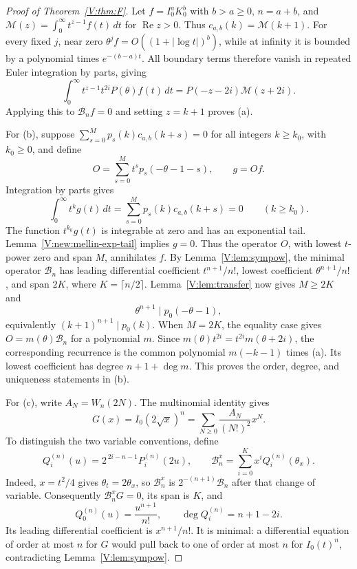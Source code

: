 \documentclass[11pt,a4paper]{article}
\theoremstyle{definition}
\theoremstyle{remark}
\numberwithin{equation}{section}
\begin{document}
\begin{proof}[Proof of Theorem~\ref{V:thm:F}]
Let $f=I_0^aK_0^b$ with $b>a\ge0$, $n=a+b$, and
$\mathcal M(z)=\int_0^\infty t^{z-1}f(t)\,dt$ for
$\operatorname{Re}z>0$. Thus $c_{a,b}(k)=\mathcal M(k+1)$.
For every fixed $j$, near zero
$\theta^jf=O((1+|\log t|)^b)$, while at infinity it is bounded by
a polynomial times $e^{-(b-a)t}$. All boundary terms therefore vanish
in repeated Euler integration by parts, giving
\[
 \int_0^\infty t^{z-1}t^{2i}P(\theta)f(t)\,dt
 =P(-z-2i)\mathcal M(z+2i).
\]
Applying this to $\mathcal B_nf=0$ and setting $z=k+1$ proves (a).

For (b), suppose
$\sum_{s=0}^{M}p_s(k)c_{a,b}(k+s)=0$ for all integers $k\ge k_0$,
with $k_0\ge0$, and define
\[
 O=\sum_{s=0}^{M}t^s p_s(-\theta-1-s),\qquad g=Of.
\]
Integration by parts gives
\[
 \int_0^\infty t^kg(t)\,dt
 =\sum_{s=0}^{M}p_s(k)c_{a,b}(k+s)=0\qquad(k\ge k_0).
\]
The function $t^{k_0}g(t)$ is integrable at zero and has an
exponential tail. Lemma~\ref{V:new:mellin-exp-tail} implies $g=0$.
Thus the operator $O$, with lowest $t$-power zero and span $M$,
annihilates $f$.
By Lemma~\ref{V:lem:sympow}, the minimal operator $\mathcal B_n$
has leading differential coefficient $t^{n+1}/n!$, lowest coefficient
$\theta^{n+1}/n!$, and span $2K$, where $K=\lceil n/2\rceil$.
Lemma~\ref{V:lem:transfer} now gives $M\ge2K$ and
\[
 \theta^{n+1}\mid p_0(-\theta-1),
\]
equivalently $(k+1)^{n+1}\mid p_0(k)$.
When $M=2K$, the equality case gives $O=m(\theta)\mathcal B_n$
for a polynomial $m$. Since
$m(\theta)t^{2i}=t^{2i}m(\theta+2i)$, the corresponding recurrence
is the common polynomial $m(-k-1)$ times (a).
Its lowest coefficient has degree $n+1+\deg m$.
This proves the order, degree, and uniqueness statements in (b).

For (c), write $A_N=W_n(2N)$. The multinomial identity gives
\[
 G(x)=I_0(2\sqrt{x})^n
 =\sum_{N\ge0}\frac{A_N}{(N!)^2}x^N.
\]
To distinguish the two variable conventions, define
\[
 Q_i^{(n)}(u)=2^{\,2i-n-1}P_i^{(n)}(2u),\qquad
 \mathcal B_n^x=\sum_{i=0}^{K}x^iQ_i^{(n)}(\theta_x).
\]
Indeed, $x=t^2/4$ gives $\theta_t=2\theta_x$, so
$\mathcal B_n^x$ is $2^{-(n+1)}\mathcal B_n$ after that change of
variable. Consequently $\mathcal B_n^xG=0$, its span is $K$, and
\[
 Q_0^{(n)}(u)=\frac{u^{n+1}}{n!},\qquad
 \deg Q_i^{(n)}=n+1-2i.
\]
Its leading differential coefficient is $x^{n+1}/n!$.
It is minimal: a differential equation of order at most $n$ for $G$
would pull back to one of order at most $n$ for $I_0(t)^n$,
contradicting Lemma~\ref{V:lem:sympow}.


\end{proof}
\end{document}
